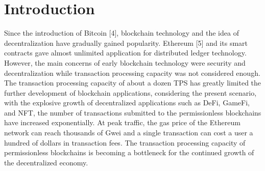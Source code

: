 \documentclass{iacrtrans}
\author{Cube Labs}
\institute{contact@cube.network}
\title[\texttt{Cube}: A High-Performance Modular Blockchain Supporting Multi-chain Architecture
]{\publname}
\begin{document}
\maketitle


\begin{abstract}
	In this paper, we propose a high-performance modular blockchain that supports a multi-chain structure. With the popularity of crypto increasing every day, scalability has become the biggest challenge for permissionless blockchains. At present, the common way to solve the scaling problem is to optimize its monolithic structure, whereas, \texttt{Cube} proposes the layered architecture by vertically segmenting settlement, execution, and data availability into three different layers and optimizing each one of them according to their specifics. \texttt{Cube} also proposes a collaborative ZK-Rollup and “Chaos Consensus” protocol. In addition, \texttt{Cube} has designed a “Time Crossing” cross-chain protocol fully compatible with the Cosmos ecosystem. With the proposed structure \texttt{Cube} can reach hundreds of thousands of TPS and eliminate the need for external data availability for Rollup and NFT, thus providing an efficient and reliable full-stack solution for the development of Web 3.0.
\end{abstract}


\section{Introduction}\label{Introduction}
Since the introduction of Bitcoin [4], blockchain technology and the idea of decentralization have gradually gained popularity. Ethereum [5] and its smart contracts gave almost unlimited application for distributed ledger technology. However, the main concerns of early blockchain technology were security and decentralization while transaction processing capacity was not considered enough. The transaction processing capacity of about a dozen TPS has greatly limited the further development of blockchain applications, considering the present scenario, with the explosive growth of decentralized applications such as DeFi, GameFi, and NFT, the number of transactions submitted to the permissionless blockchains have increased exponentially. At peak traffic, the gas price of the Ethereum network can reach thousands of Gwei and a single transaction can cost a user a hundred of dollars in transaction fees. The transaction processing capacity of permissionless blockchains is becoming a bottleneck for the continued growth of the decentralized economy.
\end{document}
